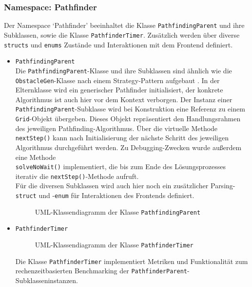 \subsubsection{Namespace: Pathfinder}
\label{subsubsec:aufbau_backend_ueberblick_pathfinder}
Der Namespace `Pathfinder' beeinhaltet die Klasse \texttt{PathfindingParent} und ihre Subklassen, sowie die Klasse \texttt{PathfinderTimer}.
Zusätzlich werden über diverse \texttt{structs} und \texttt{enums} Zustände und Interaktionen mit dem Frontend definiert.
\begin{itemize}
    \item \texttt{PathfindingParent}\\
    Die \texttt{PathfindingParent}-Klasse und ihre Subklassen sind ähnlich wie die \texttt{ObstacleGen}-Klasse nach einem Strategy-Pattern aufgebaut \cite{nesteruk2021}.
    In der Elternklasse wird ein generischer Pathfinder initialisiert, der konkrete Algorithmus ist auch hier vor dem Kontext verborgen.
    Der Instanz einer \texttt{Pathfinding\-Parent}-Subklasse wird bei Konstruktion eine Referenz zu einem \texttt{Grid}-Objekt übergeben.
    Dieses Objekt repräsentiert den Handlungsrahmen des jeweiligen Pathfinding-Algorithmus.
    Über die virtuelle Methode \texttt{nextStep()} kann nach Initialisierung der nächste Schritt des jeweiligen Algorithmus durchgeführt werden.
    Zu Debugging-Zwecken wurde außerdem eine Methode \\ \texttt{solveNoWait()} implementiert, die bis zum Ende des Lösungsprozesses
    iterativ die \texttt{nextStep()}-Methode aufruft.\\
    Für die diversen Subklassen wird auch hier noch ein zusätzlicher Parsing-\texttt{struct} und -\texttt{enum} für Interaktionen des Frontends definiert.
    \begin{figure}[H]
              \vspace{-0.5cm}
              \centering
              
              \caption{UML-Klassendiagramm der Klasse \texttt{PathfindingParent}}
              \label{fig:uml_pathfinder}
    \end{figure}
    \item \texttt{PathfinderTimer}\\
    \begin{figure}[H]
        \vspace{-0.5cm}
        \centering
        
        \caption{UML-Klassendiagramm der Klasse \texttt{PathfinderTimer}}
        \label{fig:uml_pathfinder_timer}
    \end{figure}
    Die Klasse \texttt{PathfinderTimer} implementiert Metriken und Funktionalität zum rechenzeitbasierten Benchmarking der \texttt{PathfinderParent}-Subklassen\-instanzen.
\end{itemize}
